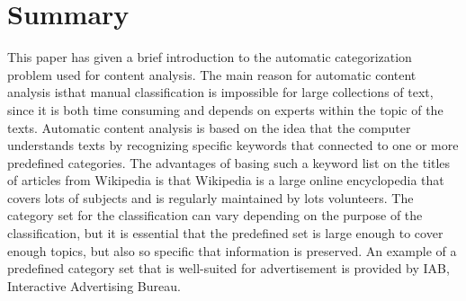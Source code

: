 \section{Summary}
This paper has given a brief introduction to the automatic categorization problem used for content analysis. The main reason for automatic content analysis isthat manual classification is impossible for large collections of text, since it is both time consuming and  depends on experts within the topic of the texts. Automatic content analysis is based on the idea that the computer understands texts by recognizing specific keywords that  connected to one or more predefined categories. The advantages of basing such a keyword list on the titles of articles from Wikipedia is that Wikipedia is a large online encyclopedia that covers lots of subjects and is regularly maintained by lots volunteers. The category set for the classification can vary depending on the purpose of the classification, but it is essential that the predefined set is large enough to cover enough topics, but also so specific that information is preserved. An example of a predefined category set that is well-suited for advertisement is provided by IAB, Interactive Advertising Bureau. 